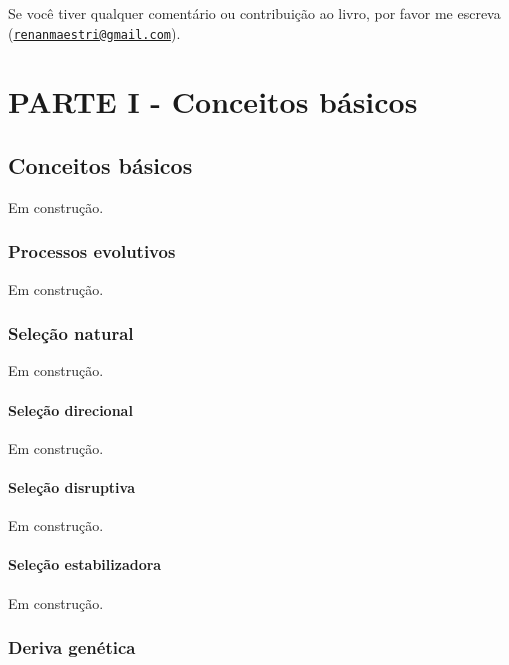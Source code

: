 \documentclass[
]{book}
\begin{document}
Se você tiver qualquer comentário ou contribuição ao livro, por favor me escreva (\href{mailto:renanmaestri@gmail.com}{\nolinkurl{renanmaestri@gmail.com}}).

\part{PARTE I - Conceitos básicos}\label{part-parte-i---conceitos-buxe1sicos}

\chapter{Conceitos básicos}\label{conceitos-buxe1sicos}

Em construção.

\section{Processos evolutivos}\label{processos-evolutivos}

Em construção.

\section{Seleção natural}\label{seleuxe7uxe3o-natural}

Em construção.

\subsection{Seleção direcional}\label{seleuxe7uxe3o-direcional}

Em construção.

\subsection{Seleção disruptiva}\label{seleuxe7uxe3o-disruptiva}

Em construção.

\subsection{Seleção estabilizadora}\label{seleuxe7uxe3o-estabilizadora}

Em construção.

\section{Deriva genética}\label{deriva-genuxe9tica}
\end{document}
